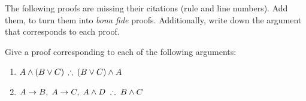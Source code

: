 %


\begin{practiceproblems}

%

\problempart
The following proofs are missing their citations (rule and line numbers). Add them, to turn them into \emph{bona fide} proofs. Additionally, write down the argument that corresponds to each proof.

\begin{fitchproof}
\end{fitchproof}

\solutions
\problempart
Give a proof corresponding to each of the following arguments:
\begin{enumerate}
\item $A\eand (B\eor C)\,\therefore\,(B\eor C)\eand A$
\item $A\eif B, \; A\eif C,\; A\eand D\;\therefore\; B\eand C$
\end{enumerate}



\end{practiceproblems}

